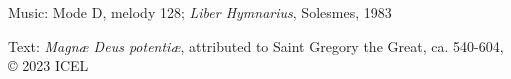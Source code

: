 

\begin{hymnsource}
Music: Mode D, melody 128; \emph{Liber Hymnarius}, Solesmes, 1983

Text: \emph{Magnæ Deus potentiæ}, attributed to Saint Gregory the Great, ca. 540-604, © 2023 ICEL
\end{hymnsource}
